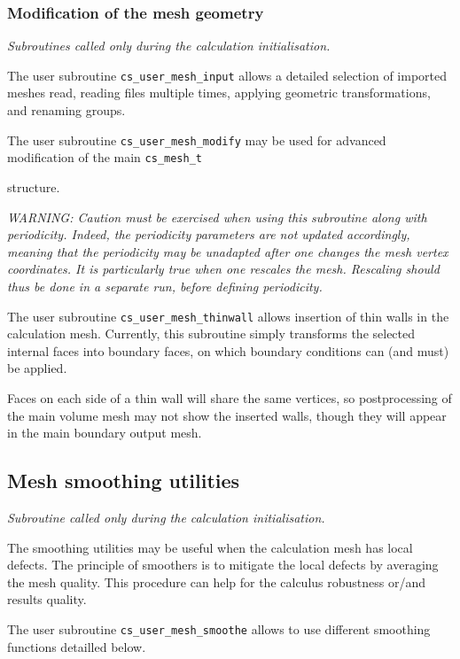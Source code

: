 {{{%
\subsubsection{Modification of the mesh geometry}
\noindent
\textit{Subroutines called only during the calculation initialisation.}

The user subroutine \texttt{cs\_user\_mesh\_input} allows a detailed
selection of imported meshes read, reading files multiple times,
applying geometric transformations, and renaming groups.

The user subroutine \texttt{cs\_user\_mesh\_modify} may be used
for advanced modification of the main \texttt{cs\_mesh\_t}} structure.

{\em WARNING: Caution must be exercised when using this subroutine
along with periodicity. Indeed, the periodicity parameters are not
updated accordingly, meaning that the periodicity may be unadapted
after one changes the mesh vertex coordinates. It is particularly
true when one rescales the mesh. Rescaling should thus be done
in a separate run, before defining periodicity.}

The user subroutine \texttt{cs\_user\_mesh\_thinwall} allows
insertion of thin walls in the calculation mesh. Currently, this
subroutine simply transforms the selected internal faces into boundary
faces, on which boundary conditions can (and must) be applied.

Faces on each side of a thin wall will share the same vertices,
so postprocessing of the main volume mesh may not show the
inserted walls, though they will appear in the main boundary
output mesh.

\subsection{Mesh smoothing utilities}
\noindent
\textit{Subroutine called only during the calculation initialisation.}

The smoothing utilities may be useful when the calculation mesh has local
defects. 
The principle of smoothers is to mitigate the local defects by averaging
the mesh quality. This procedure can help for the calculus robustness or/and 
results quality.

The user subroutine \texttt{cs\_user\_mesh\_smoothe} allows to use different
smoothing functions detailled below.

}}
